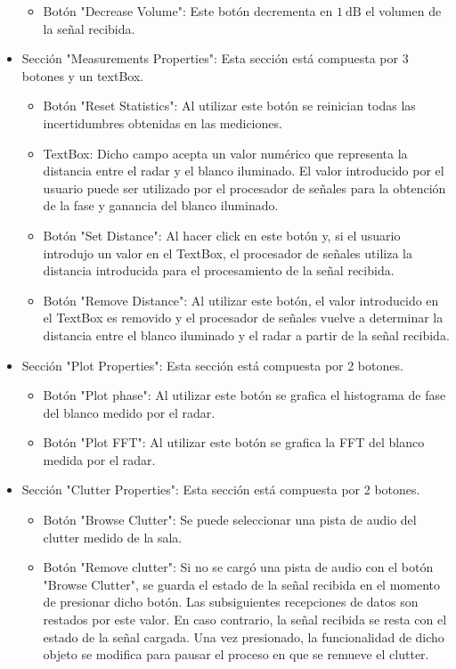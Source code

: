 \begin{itemize}
\begin{itemize}
    \item Botón "Decrease Volume": Este botón decrementa en $\SI{1}{\dB}$ el volumen de la señal recibida.
  \end{itemize}

  \item Sección "Measurements Properties": Esta sección está compuesta por 3 botones y un textBox.
  \begin{itemize}
    \item Botón "Reset Statistics": Al utilizar este botón se reinician todas las incertidumbres obtenidas en las mediciones.

    \item TextBox: Dicho campo acepta un valor numérico que representa la distancia entre el radar y el blanco iluminado. El valor introducido por el usuario puede ser utilizado por el procesador de señales para la obtención de la fase y ganancia del blanco iluminado.

    \item Botón "Set Distance": Al hacer click en este botón y, si el usuario introdujo un valor en el TextBox, el procesador de señales utiliza la distancia introducida para el procesamiento de la señal recibida.

    \item Botón "Remove Distance": Al utilizar este botón, el valor introducido en el TextBox es removido y el procesador de señales vuelve a determinar la distancia entre el blanco iluminado y el radar a partir de la señal recibida.
  \end{itemize}

  \item Sección "Plot Properties": Esta sección está compuesta por 2 botones.
  \begin{itemize}
    \item Botón "Plot phase": Al utilizar este botón se grafica el histograma de fase del blanco medido por el radar.

    \item Botón "Plot FFT": Al utilizar este botón se grafica la FFT del blanco medida por el radar.
  \end{itemize}

  \item Sección "Clutter Properties": Esta sección está compuesta por 2 botones.
  \begin{itemize}
    \item Botón "Browse Clutter": Se puede seleccionar una pista de audio del clutter medido de la sala.

    \item Botón "Remove clutter": Si no se cargó una pista de audio con el botón "Browse Clutter", se guarda el estado de la señal recibida en el momento de presionar dicho botón. Las subsiguientes recepciones de datos son restados por este valor. En caso contrario, la señal recibida se resta con el estado de la señal cargada. Una vez presionado, la funcionalidad de dicho objeto se modifica para pausar el proceso en que se remueve el clutter.
  \end{itemize}
\end{itemize}


